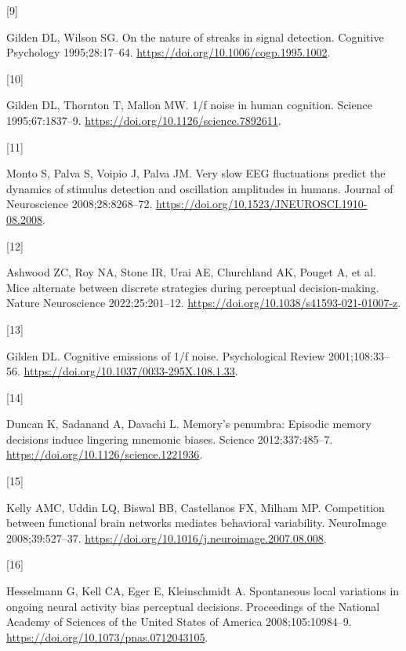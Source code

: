 \documentclass[
]{article}
\newlength{\cslhangindent}
\newlength{\csllabelwidth}
\newlength{\cslentryspacingunit} %
\newenvironment{CSLReferences}[2] %
 {%
  \setlength{\parindent}{0pt}
  \ifodd #1
  \let\oldpar\par
  \def\par{\hangindent=\cslhangindent\oldpar}
  \fi
  \setlength{\parskip}{#2\cslentryspacingunit}
 }%
 {}
\newcommand{\CSLLeftMargin}[1]{\parbox[t]{\csllabelwidth}{#1}}
\newcommand{\CSLRightInline}[1]{\parbox[t]{\linewidth - \csllabelwidth}{#1}\break}
\begin{document}
\begin{CSLReferences}{0}{0}
\leavevmode{}%
\CSLLeftMargin{{[}9{]} }%
\CSLRightInline{Gilden DL, Wilson SG. On the nature of streaks in signal
detection. Cognitive Psychology 1995;28:17--64.
\url{https://doi.org/10.1006/cogp.1995.1002}.}

\leavevmode{}%
\CSLLeftMargin{{[}10{]} }%
\CSLRightInline{Gilden DL, Thornton T, Mallon MW. 1/f noise in human
cognition. Science 1995;67:1837--9.
\url{https://doi.org/10.1126/science.7892611}.}

\leavevmode{}%
\CSLLeftMargin{{[}11{]} }%
\CSLRightInline{Monto S, Palva S, Voipio J, Palva JM. Very slow EEG
fluctuations predict the dynamics of stimulus detection and oscillation
amplitudes in humans. Journal of Neuroscience 2008;28:8268--72.
\url{https://doi.org/10.1523/JNEUROSCI.1910-08.2008}.}

\leavevmode{}%
\CSLLeftMargin{{[}12{]} }%
\CSLRightInline{Ashwood ZC, Roy NA, Stone IR, Urai AE, Churchland AK,
Pouget A, et al. Mice alternate between discrete strategies during
perceptual decision-making. Nature Neuroscience 2022;25:201--12.
\url{https://doi.org/10.1038/s41593-021-01007-z}.}

\leavevmode{}%
\CSLLeftMargin{{[}13{]} }%
\CSLRightInline{Gilden DL. Cognitive emissions of 1/f noise.
Psychological Review 2001;108:33--56.
\url{https://doi.org/10.1037/0033-295X.108.1.33}.}

\leavevmode{}%
\CSLLeftMargin{{[}14{]} }%
\CSLRightInline{Duncan K, Sadanand A, Davachi L. Memory's penumbra:
Episodic memory decisions induce lingering mnemonic biases. Science
2012;337:485--7. \url{https://doi.org/10.1126/science.1221936}.}

\leavevmode{}%
\CSLLeftMargin{{[}15{]} }%
\CSLRightInline{Kelly AMC, Uddin LQ, Biswal BB, Castellanos FX, Milham
MP. Competition between functional brain networks mediates behavioral
variability. NeuroImage 2008;39:527--37.
\url{https://doi.org/10.1016/j.neuroimage.2007.08.008}.}

\leavevmode{}%
\CSLLeftMargin{{[}16{]} }%
\CSLRightInline{Hesselmann G, Kell CA, Eger E, Kleinschmidt A.
Spontaneous local variations in ongoing neural activity bias perceptual
decisions. Proceedings of the National Academy of Sciences of the United
States of America 2008;105:10984--9.
\url{https://doi.org/10.1073/pnas.0712043105}.}


\end{CSLReferences}
\end{document}
